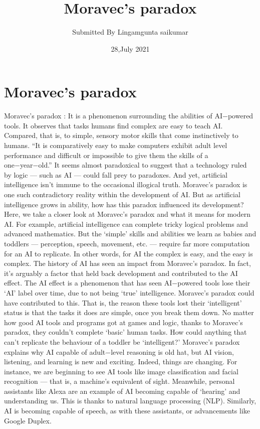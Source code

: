 \documentclass{article}
\title{Moravec’s paradox}
\author{Submitted By Lingamgunta saikumar}
\date{28,July 2021}
\begin{document}
\maketitle

\section{Moravec’s paradox}
Moravec’s paradox :
It is a phenomenon surrounding the abilities of AI−powered tools. It observes that tasks humans find complex are easy to teach AI. Compared, that is, to simple, sensory motor skills that come instinctively to humans. 
“It is comparatively easy to make computers exhibit adult level performance and difficult or impossible to give them the skills of a one−year−old.” 
It seems almost paradoxical to suggest that a technology ruled by logic — such as AI — could fall prey to paradoxes. And yet, artificial intelligence isn’t immune to the occasional illogical truth. Moravec’s paradox is one such contradictory reality within the development of AI. But as artificial intelligence grows in ability, how has this paradox influenced its development? Here, we take a closer look at Moravec’s paradox and what it means for modern AI.
For example, artificial intelligence can complete tricky logical problems and advanced mathematics. But the ‘simple’ skills and abilities we learn as babies and toddlers — perception, speech, movement, etc. — require far more computation for an AI to replicate. In other words, for AI the complex is easy, and the easy is complex. The history of AI has seen an impact from Moravec’s paradox. In fact, it’s arguably a factor that held back development and contributed to the AI effect. 
The AI effect is a phenomenon that has seen AI−powered tools lose their ‘AI’ label over time, due to not being ‘true’ intelligence. Moravec’s paradox could have contributed to this. That is, the reason these tools lost their ‘intelligent’ status is that the tasks it does are simple, once you break them down. No matter how good AI tools and programs got at games and logic, thanks to Moravec’s paradox, they couldn’t complete ‘basic’ human tasks. How could anything that can’t replicate the behaviour of a toddler be ‘intelligent?’
Moravec’s paradox explains why AI capable of adult−level reasoning is old hat, but AI vision, listening, and learning is new and exciting. Indeed, things are changing. For instance, we are beginning to see AI tools like image classification and facial recognition — that is, a machine’s equivalent of sight. Meanwhile, personal assistants like Alexa are an example of AI becoming capable of ‘hearing’ and understanding us. This is thanks to natural language processing (NLP). Similarly, AI is becoming capable of speech, as with these assistants, or advancements like Google Duplex. 
\end{document}
